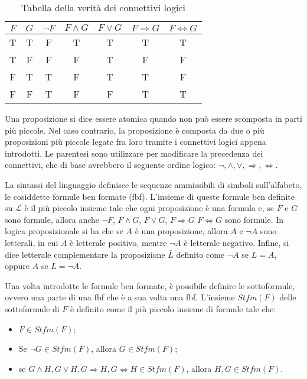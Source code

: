 \begin{table}[!th] \label{Tabella delle verità}
  \caption{Tabella della verità dei connettivi logici}
  \vspace*{10pt}

  \centering
  \begin{tabular}{c c || c | c | c | c | c }
    \(F\) & \(G\) & \(\lnot F\) & \(F \wedge G\) & \(F \vee G\) & \(F \Rightarrow G\) & \(F\Leftrightarrow G\) \\
    \hline
    T & T & F & T & T & T & T \\
    T & F & F & F & T & F & F \\
    F & T & T & F & T & T & F \\
    F & F & T & F & F & T & T \\
  \end{tabular}  
\end{table}

Una proposizione si dice essere atomica quando non può essere scomposta in parti più piccole. Nel caso contrario, la proposizione è composta da due o più proposizioni più piccole legate fra loro tramite i connettivi logici appena introdotti. Le parentesi sono utilizzare per modificare la precedenza dei connettivi, che di base avrebbero il seguente ordine logico: \(\lnot, \wedge, \vee, \Rightarrow, \Leftrightarrow\).

La sintassi del linguaggio definisce le sequenze ammissibili di simboli sull'alfabeto, le cosiddette formule ben formate (fbf). L'insieme di queste formule ben definite su \(\mathcal L\) è il più piccolo insieme tale che ogni proposizione è una formula e, se \(F\) e \(G\) sono formule, allora anche \(\lnot F\), \(F \wedge G\), \(F \vee G\), \(F \Rightarrow G\) \(F \Leftrightarrow G\) sono formule. In logica proposizionale si ha che se \(A\) è una proposizione, allora \(A\) e \(\lnot A\) sono letterali, in cui \(A\) è letterale positivo, mentre \(\lnot A\) è letterale negativo. Infine, si dice letterale complementare la proposizione \(\bar L\) definito come \(\lnot A\) se \(L=A\), oppure \(A\) se \(L=\lnot A\). 

\break

Una volta introdotte le formule ben formate, è possibile definire le sottoformule, ovvero una parte di una fbf che è a sua volta una fbf. L'insieme  \(Stfm(F)\) delle sottoformule di \(F\) è definito come il più piccolo insieme di formule tale che:
\begin{itemize}
  \item \(F \in Stfm(F)\);
  \item Se \(\lnot G \in Stfm(F)\), allora \(G \in Stfm(F)\);
  \item se \(G \wedge H, G\vee H, G \Rightarrow H, G \Leftrightarrow H \in Stfm(F)\), allora \(H, G \in Stfm(F)\). 
\end{itemize}


